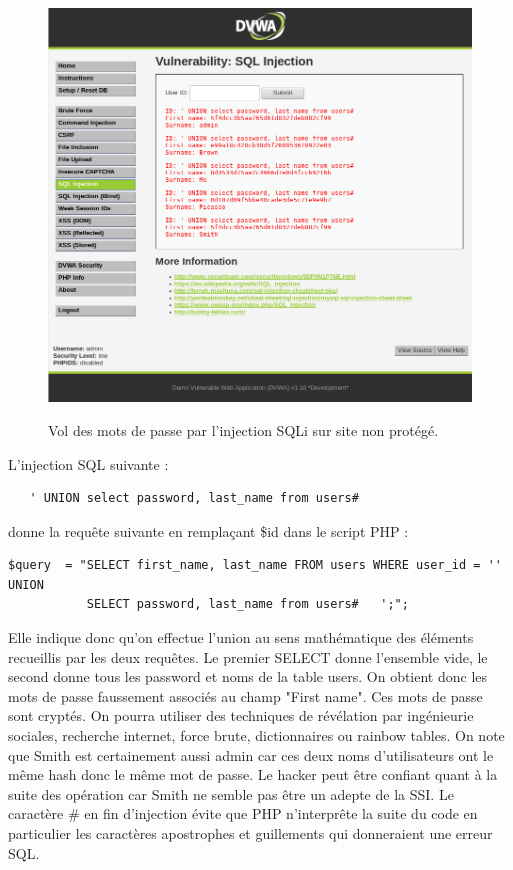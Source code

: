 \begin{figure}[!h]
	\begin{center}
		\label{}
		\includegraphics[scale=\scaledvwa]{images/sql/sqli_low.png}
		\caption{Vol des mots de passe par l'injection SQLi sur site non protégé.}
	\end{center}
\end{figure}

L'injection SQL suivante :
{\color{red}

\begin{verbatim}
   ' UNION select password, last_name from users#
\end{verbatim}
}

donne la requête suivante en remplaçant \$id dans le script PHP :
{\color{red}
\begin{verbatim}
$query  = "SELECT first_name, last_name FROM users WHERE user_id = '' UNION 
           SELECT password, last_name from users#   ';"; 
\end{verbatim}
}
Elle indique donc qu'on effectue l'union au sens mathématique des éléments recueillis par les deux requêtes. Le premier SELECT donne l'ensemble vide, le second donne tous les password et noms de la table users. On obtient donc les mots de passe faussement associés au champ "First name". Ces mots de passe sont cryptés. On pourra utiliser des techniques de révélation par ingénieurie sociales, recherche internet, force brute, dictionnaires ou rainbow tables. On note que Smith est certainement aussi admin car ces deux noms d'utilisateurs ont le même hash donc le même mot de passe. Le hacker peut être confiant quant à la suite des opération car Smith ne semble pas être un adepte de la SSI. Le caractère \# en fin d'injection évite que PHP n'interprête la suite du code en particulier les caractères apostrophes et guillements qui donneraient une erreur SQL.

